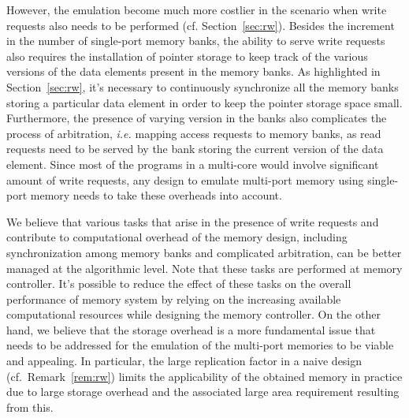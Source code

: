 However, the emulation become much more costlier in the scenario when write requests also needs to be performed (cf. Section~\ref{sec:rw}). Besides the increment in the number of single-port memory banks, the ability to serve write requests also requires the installation of pointer storage to keep track of the various versions of the data elements present in the memory banks. As highlighted in Section~\ref{sec:rw}, it's necessary to continuously synchronize all the memory banks storing a particular data element in order to keep the pointer storage space small.  Furthermore, the presence of varying version in the banks also complicates the process of arbitration, \textit{i.e.} mapping access requests to memory banks, as read requests need to be served by the bank storing the current version of the data element. Since most of the programs in a multi-core would involve significant amount of write requests, any design to emulate multi-port memory using single-port memory needs to take these overheads into account. 

{\color{red}We believe that various tasks that arise in the presence of write requests and contribute to computational overhead of the memory design, including synchronization among memory banks and complicated arbitration, can be better managed at the algorithmic level. Note that these tasks are performed at memory controller. It's possible to reduce the effect of these tasks on the overall performance of memory system by relying on the increasing available computational resources while designing the memory controller. On the other hand, we believe that the storage overhead is a more fundamental issue that needs to be addressed for the emulation of the multi-port memories to be viable and appealing. In particular, the large replication factor in a naive design (cf.~Remark~\ref{rem:rw}) limits the applicability of the obtained memory in practice due to large storage overhead and the associated large area requirement resulting from this.}

